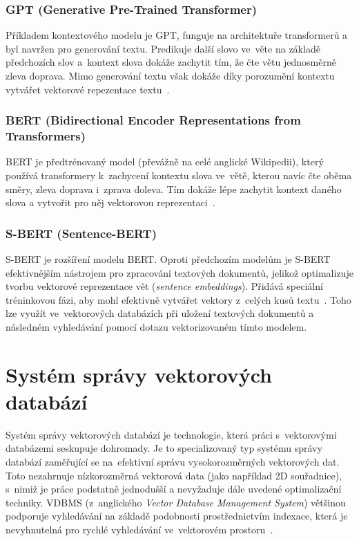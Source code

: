 \subsubsection{GPT (Generative Pre-Trained Transformer)}
Příkladem kontextového modelu je GPT, funguje na architektuře transformerů a byl navržen pro generování textu. Predikuje další slovo ve~věte na základě předchozích slov a~kontext slova dokáže zachytit tím, že čte větu jednosměrně zleva doprava. Mimo generování textu však dokáže díky porozumění kontextu vytvářet vektorové repezentace textu~\cite{yenduri2023_gpt_review}.

\subsubsection{BERT (Bidirectional Encoder Representations from Transformers)}
BERT je předtrénovaný model (převážně na celé anglické Wikipedii), který používá transformery k~zachycení kontextu slova ve~větě, kterou navíc čte oběma směry, zleva doprava i~zprava doleva. Tím dokáže lépe zachytit kontext daného slova a vytvořit pro něj vektorovou reprezentaci~\cite{devlin2018_bert}.

\subsubsection{S-BERT (Sentence-BERT)}
S-BERT je rozšíření modelu BERT. Oproti předchozím modelům je S-BERT efektivnějším nástrojem pro zpracování textových dokumentů, jelikož optimalizuje tvorbu vektorové reprezentace vět (\textit{sentence embeddings}). Přidává speciální tréninkovou fázi, aby mohl efektivně vytvářet vektory z~celých kusů textu~\cite{reimers2019_sbert}. Toho lze využít ve~vektorových databázích při uložení textových dokumentů a následném vyhledávání pomocí dotazu vektorizovaném tímto modelem.

\section{Systém správy vektorových databází}
Systém správy vektorových databází je technologie, která práci s~vektorovými databázemi seskupuje dohromady. Je to specializovaný typ systému správy databází zaměřující se na~efektivní správu vysokorozměrných vektorových dat. Toto nezahrnuje nízkorozměrná vektorová data (jako například 2D souřadnice), s~nimiž je práce podstatně jednodušší a nevyžaduje dále uvedené optimalizační techniky. VDBMS (z~anglického \textit{Vector Database Management System}) většinou podporuje vyhledávání na základě podobnosti prostřednictvím indexace, která je nevyhnutelná pro rychlé vyhledávání ve~vektorovém prostoru~\cite{Taipalus_2024}.

